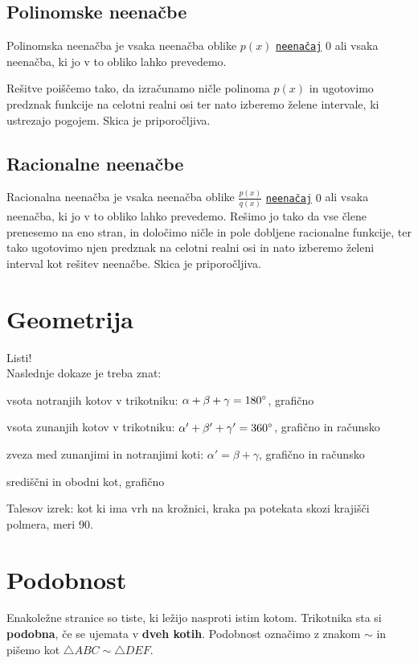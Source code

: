 \documentclass[a4paper,oneside,12pt,fleqn]{article}
\def\deg{\degree}
\numberwithin{equation}{section}
\newenvironment{enumerate*}%
{
\vspace{-12pt}%
\begin{enumerate}%
\setlength{\itemsep}{0pt}%
\setlength{\parskip}{2pt}}%
{\end{enumerate}}
\begin{document}
\subsection{Polinomske neenačbe}
\label{sec:neenac:pol}
Polinomska neenačba je vsaka neenačba oblike $p(x)$
\hyperlink{point:neenacaj}{\texttt{neenačaj}} $0$ ali vsaka
neenačba, ki jo v to obliko lahko prevedemo.

Rešitve poiščemo tako, da izračunamo ničle polinoma $p(x)$
in ugotovimo predznak funkcije na celotni realni osi ter nato 
izberemo želene intervale, ki ustrezajo pogojem. Skica je priporočljiva.

\subsection{Racionalne neenačbe}
\label{sec:neenac:rac}
Racionalna neenačba je vsaka neenačba oblike $\frac{p(x)}{q(x)}$
\hyperlink{point:neenacaj}{\texttt{neenačaj}} $0$ ali
vsaka neenačba, ki jo v to obliko lahko prevedemo. Rešimo jo
tako da vse člene prenesemo na eno stran, in določimo ničle in pole dobljene racionalne
funkcije, ter tako ugotovimo njen predznak na celotni realni
osi in nato izberemo želeni interval kot rešitev neenačbe. Skica je priporočljiva.

\section{Geometrija}
\label{sec:geom}
Listi!\\
Naslednje dokaze je treba znat:
\begin{enumerate*}
  \item vsota notranjih kotov v trikotniku: $\alpha + \beta + \gamma = 180\deg$, grafično
  \item vsota zunanjih kotov v trikotniku: $\alpha' + \beta' + \gamma' = 360\deg$, grafično in računsko
  \item zveza med zunanjimi in notranjimi koti: $\alpha' = \beta + \gamma$, grafično in
    računsko \label{enum:geom:notrzun}
  \item središčni in obodni kot, grafično
  \item Talesov izrek: kot ki ima vrh na krožnici, kraka pa potekata skozi krajišči
    polmera, meri 90\deg.
\end{enumerate*}

\section{Podobnost}
\label{sec:podob}
Enakoležne stranice so tiste, ki ležijo nasproti istim kotom.
Trikotnika sta si \textbf{podobna}, če se ujemata v \textbf{dveh kotih}. Podobnost označimo  z
znakom $\sim$ in pišemo kot $\triangle ABC \sim \triangle DEF$.
\end{document}
